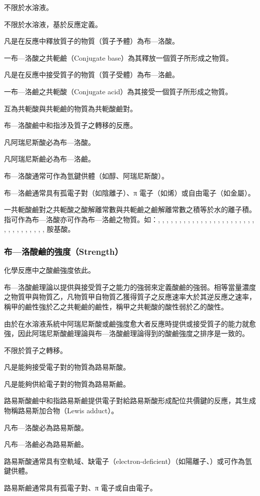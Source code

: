 \documentclass[a4paper,12pt]{article}
\begin{document}
不限於水溶液。
\bit
\item 不限於水溶液，基於反應定義。
\item 凡是在反應中釋放質子的物質（質子予體）為布—洛酸。
\item 一布—洛酸之共軛鹼（Conjugate base）為其釋放一個質子所形成之物質。
\item 凡是在反應中接受質子的物質（質子受體）為布—洛鹼。
\item 一布—洛鹼之共軛酸（Conjugate acid）為其接受一個質子所形成之物質。
\item 互為共軛酸與共軛鹼的物質為共軛酸鹼對。
\item 布—洛酸鹼中和指涉及質子之轉移的反應。
\eit
{}
\bit
\item 凡阿瑞尼斯酸必為布—洛酸。
\item 凡阿瑞尼斯鹼必為布—洛鹼。
\item 布—洛酸通常可作為氫鍵供體（如醇、阿瑞尼斯酸）。
\item 布—洛鹼通常具有孤電子對（如陰離子）、π 電子（如烯）或自由電子（如金屬）。
\item 一共軛酸鹼對之共軛酸之酸解離常數與共軛鹼之鹼解離常數之積等於水的離子積。
\eit
{}
指可作為布—洛酸亦可作為布—洛鹼之物質。如：, , , , , , , , , , , , , , , , , , , , , , , , , , , , , , , , , 胺基酸。
\subsubsection{布—洛酸鹼的強度（Strength）}
化學反應中之酸鹼強度依此。

布—洛酸鹼理論以提供與接受質子之能力的強弱來定義酸鹼的強弱。相等當量濃度之物質甲與物質乙，凡物質甲自物質乙獲得質子之反應速率大於其逆反應之速率，稱甲的鹼性強於乙之共軛鹼的鹼性，稱甲之共軛酸的酸性弱於乙的酸性。

由於在水溶液系統中阿瑞尼斯酸或鹼強度愈大者反應時提供或接受質子的能力就愈強，因此阿瑞尼斯酸鹼理論與布—洛酸鹼理論得到的酸鹼強度之排序是一致的。
\bit
\item 不限於質子之轉移。
\item 凡是能夠接受電子對的物質為路易斯酸。
\item 凡是能夠供給電子對的物質為路易斯鹼。
\item 路易斯酸鹼中和指路易斯鹼提供電子對給路易斯酸形成配位共價鍵的反應，其生成物稱路易斯加合物（Lewis adduct）。
\eit
{}
\bit
\item 凡布—洛酸必為路易斯酸。
\item 凡布—洛鹼必為路易斯鹼。
\item 路易斯酸通常具有空軌域、缺電子（electron-deficient）（如陽離子、）或可作為氫鍵供體。
\item 路易斯鹼通常具有孤電子對、π 電子或自由電子。
\eit
\end{document}
